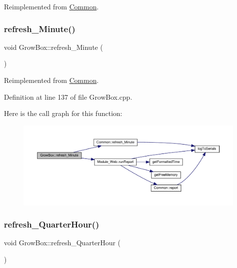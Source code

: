 Reimplemented from \hyperlink{class_common_a14e4462a94bd118028ce1d487ca0292c}{Common}.

\mbox{\label{class_grow_box_a8763d725baee8237bc63865d464375d8}} 
\subsubsection{\texorpdfstring{refresh\+\_\+\+Minute()}{refresh\_Minute()}\hspace{0.1cm}{\footnotesize\ttfamily [2/2]}}
{\footnotesize\ttfamily void Grow\+Box\+::refresh\+\_\+\+Minute (\begin{DoxyParamCaption}{ }\end{DoxyParamCaption})\hspace{0.3cm}{\ttfamily [virtual]}}



Reimplemented from \hyperlink{class_common_a14e4462a94bd118028ce1d487ca0292c}{Common}.



Definition at line 137 of file Grow\+Box.\+cpp.

Here is the call graph for this function\+:
\nopagebreak
\begin{figure}[H]
\begin{center}
\leavevmode
\includegraphics[width=350pt]{class_grow_box_a8763d725baee8237bc63865d464375d8_cgraph}
\end{center}
\end{figure}
\mbox{\label{class_grow_box_ac542032f42c8d6eac941ba4d98b73447}} 
\subsubsection{\texorpdfstring{refresh\+\_\+\+Quarter\+Hour()}{refresh\_QuarterHour()}\hspace{0.1cm}{\footnotesize\ttfamily [1/2]}}
{\footnotesize\ttfamily void Grow\+Box\+::refresh\+\_\+\+Quarter\+Hour (\begin{DoxyParamCaption}{ }\end{DoxyParamCaption})\hspace{0.3cm}{\ttfamily [virtual]}}



